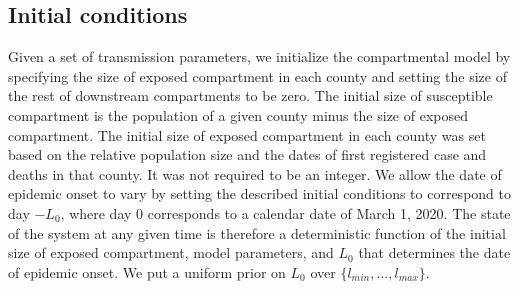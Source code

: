 \documentclass[11pt]{article}
\newcommand{\btheta}{\boldsymbol{\theta}}
\begin{document}

\subsection{Initial conditions} %
Given a set of transmission parameters, we initialize the compartmental model by specifying the size of exposed compartment in each county and setting the size of the rest of downstream compartments to be zero. The initial size of susceptible compartment is the population of a given county minus the size of exposed compartment. The initial size of exposed compartment in each county was set based on the relative population size and the dates of first registered case and deaths in that county. It was not required to be an integer. 
We allow the date of epidemic onset to vary by setting the described initial conditions to correspond to day $-L_0$, where day $0$ corresponds to a calendar date of March 1, 2020. 
The state of the system at any given time is therefore a deterministic function of the initial size of exposed compartment, model parameters, and $L_0$ that determines the date of epidemic onset. We put a uniform prior on $L_{0}$ over $\{l_{min}, \ldots, l_{max}\}$.
\end{document}

